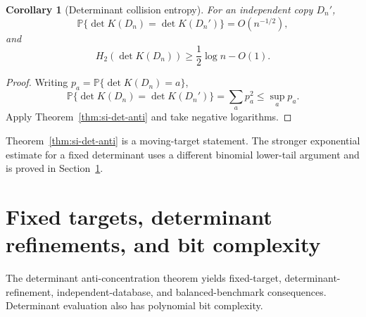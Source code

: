 \documentclass[9pt,twoside]{pnas-new}
\newtheorem{corollary}[theorem]{Corollary}
\theoremstyle{definition}
\theoremstyle{remark}
\renewcommand{\Pr}{\mathbb{P}}
\begin{document}
\begin{corollary}[Determinant collision entropy]
\label{cor:si-det-entropy}
For an independent copy $D_n'$,
\[
 \Pr\{\det K(D_n)=\det K(D_n')\}=O(n^{-1/2}),
\]
and
\[
 H_2(\det K(D_n))\ge\frac12\log n-O(1).
\]
\end{corollary}

\begin{proof}
Writing $p_a=\Pr\{\det K(D_n)=a\}$,
\[
 \Pr\{\det K(D_n)=\det K(D_n')\}
 =\sum_a p_a^2
 \le\sup_a p_a.
\]
Apply Theorem~\ref{thm:si-det-anti} and take negative logarithms.
\end{proof}

Theorem~\ref{thm:si-det-anti} is a moving-target statement. The stronger exponential estimate for a fixed determinant uses a different binomial lower-tail argument and is proved in Section~\ref{sec:si-fixed-targets}.
\section{Fixed targets, determinant refinements, and bit complexity}
\label{sec:si-fixed-targets}
The determinant anti-concentration theorem yields fixed-target, determinant-refinement, independent-database, and balanced-benchmark consequences. Determinant evaluation also has polynomial bit complexity.
\end{document}
